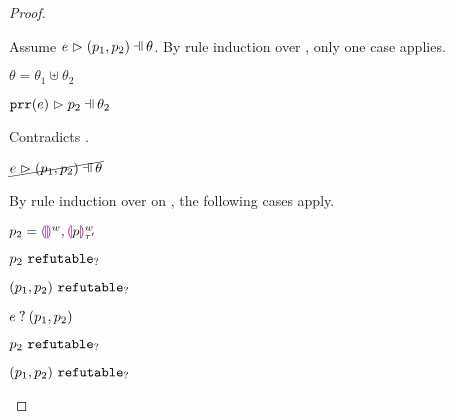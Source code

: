 \begin{proof}
\begin{byCases}
\begin{byCases}
\begin{byCases}
            Assume $\hpatmatch{e}{\hpair{p_1}{p_2}}{\theta}$. By rule induction over , only one case applies.
            \begin{byCases}
            \item[\text{(\ref{rule:MNotIntroPair})}]
                \begin{pfsteps*}
                \item $\theta=\theta_1\uplus\theta_2$ 
                \item $\hpatmatch{\hprr{e}}{p_2}{\theta_2}$  
                \end{pfsteps*}
                Contradicts .
            \end{byCases}
            \begin{pfsteps*}
            \item $\cancel{\hpatmatch{e}{\hpair{p_1}{p_2}}{\theta}}$ 
            \end{pfsteps*}
            By rule induction over  on , the following cases apply.
            \begin{byCases}
            \item[\text{(\ref{rule:MMEHole}),(\ref{rule:MMHole})}]
                \begin{pfsteps*}
                \item $p_2=\textcolor{violet}{\llparenthesis}\textcolor{violet}{\rrparenthesis}^{w},\textcolor{violet}{\llparenthesis} p\textcolor{violet}{\rrparenthesis}^{w}_{\tau'}$ 
                \item $p_2 ~\mathtt{refutable}_?$  
                \item $(p_1 , p_2) ~\mathtt{refutable}_?$  
                \item $e \mathbin{?} (p_1 , p_2)$ 
                \end{pfsteps*}
            \item[\text{(\ref{rule:MMNotIntro})}]
                \begin{pfsteps*}
                \item $p_2 ~\mathtt{refutable}_?$  
                \item $(p_1 , p_2) ~\mathtt{refutable}_?$  

\end{pfsteps*}
\end{byCases}
\end{byCases}
\end{byCases}
\end{byCases}
\end{proof}
